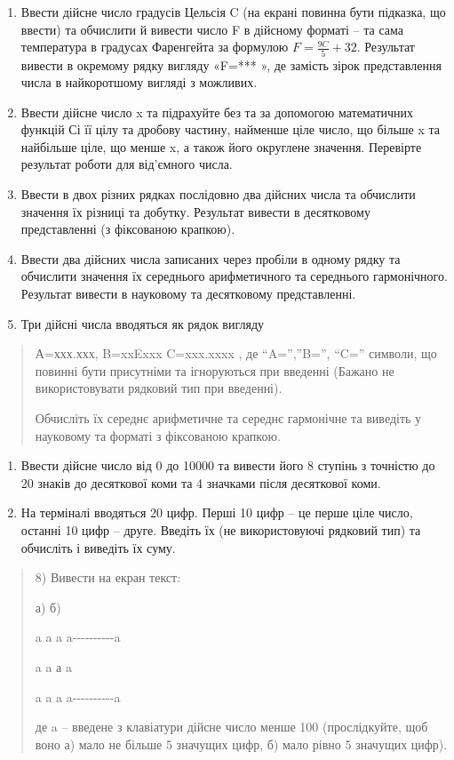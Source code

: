 \documentclass[]{article}
\begin{document}
\begin{enumerate}
\def\labelenumi{\arabic{enumi})}
\item
  Ввести дійсне число градусів Цельсія C (на екрані повинна бути
  підказка, що ввести) та обчислити й вивести число F в дійсному форматі
  -- та сама температура в градусах Фаренгейта за формулою
  \(F = \frac{9C}{5} + 32\). Результат вивести в окремому рядку вигляду
  «F=*** », де замість зірок представлення числа в найкоротшому вигляді
  з можливих.
\item
  Ввести дійсне число x та підрахуйте без та за допомогою математичних
  функцій Сі її цілу та дробову частину, найменше ціле число, що більше
  x та найбільше ціле, що менше x, а також його округлене значення.
  Перевірте результат роботи для від'ємного числа.
\item
  Ввести в двох різних рядках послідовно два дійсних числа та обчислити
  значення їх різниці та добутку. Результат вивести в десятковому
  представленні (з фіксованою крапкою).
\item
  Ввести два дійсних числа записаних через пробіли в одному рядку та
  обчислити значення їх середнього арифметичного та середнього
  гармонічного. Результат вивести в науковому та десятковому
  представленні.
\item
  Три дійсні числа вводяться як рядок вигляду
\end{enumerate}

\begin{quote}
А=ххх.ххх, B=xxExxx C=xxx.xxxx , де ``A='',''B='', ``C='' символи, що
повинні бути присутніми та ігноруються при введенні (Бажано не
використовувати рядковий тип при введенні).

Обчисліть їх середнє арифметичне та середнє гармонічне та виведіть у
науковому та форматі з фіксованою крапкою.
\end{quote}

\begin{enumerate}
\def\labelenumi{\arabic{enumi})}
\item
  Ввести дійсне число від 0 до 10000 та вивести його 8 ступінь з
  точністю до 20 знаків до десяткової коми та 4 значками після
  десяткової коми.
\item
  На терміналі вводяться 20 цифр. Перші 10 цифр -- це перше ціле число,
  останні 10 цифр -- друге. Введіть їх (не використовуючі рядковий тип)
  та обчисліть і виведіть їх суму.
\end{enumerate}

\begin{quote}
8) Вивести на екран текст:

а) б)

a a a a-\/-\/-\/-\/-\/-\/-\/-\/-\/-a

a a а \textbar{} a \textbar{}

a a a a-\/-\/-\/-\/-\/-\/-\/-\/-\/-a

де a -- введене з клавіатури дійсне число менше 100 (прослідкуйте, щоб
воно а) мало не більше 5 значущих цифр, б) мало рівно 5 значущих цифр).
\end{quote}
\end{document}

